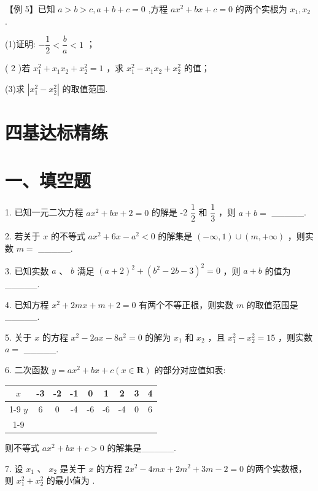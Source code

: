 【例 5】已知 $a > b > c,a + b + c = 0$ ,方程 $a{x}^{2} + {bx} + c = 0$ 的两个实根为 ${x}_{1},{x}_{2}$ .

(1)证明: $- \dfrac{1}{2} < \dfrac{b}{a} < 1$ ；

( 2 )若 ${x}_{1}^{2} + {x}_{1}{x}_{2} + {x}_{2}^{2} = 1$ ，求 ${x}_{1}^{2} - {x}_{1}{x}_{2} + {x}_{2}^{2}$ 的值；

(3)求 $\left| {{x}_{1}^{2} - {x}_{2}^{2}}\right|$ 的取值范围.

\section*{四基达标精练}

\section*{一、填空题}

1. 已知一元二次方程 $a{x}^{2} + {bx} + 2 = 0$ 的解是 -2 $\dfrac{1}{2}$ 和 $\dfrac{1}{3}$ ，则 $a + b =$ \_\_\_\_\_.

2. 若关于 $x$ 的不等式 $a{x}^{2} + {6x} - {a}^{2} < 0$ 的解集是 $\left( {-\infty ,1}\right)  \cup  \left( {m, + \infty }\right)$ ，则实数 $m =$ \_\_\_\_\_.

3. 已知实数 $a$ 、 $b$ 满足 ${\left( a + 2\right) }^{2} + {\left( {b}^{2} - 2b - 3\right) }^{2} = 0$ ，则 $a + b$ 的值为\_\_\_\_\_.

4. 已知方程 ${x}^{2} + {2mx} + m + 2 = 0$ 有两个不等正根，则实数 $m$ 的取值范围是\_\_\_\_\_.

5. 关于 $x$ 的方程 ${x}^{2} - {2ax} - 8{a}^{2} = 0$ 的解为 ${x}_{1}$ 和 ${x}_{2}$ ，且 ${x}_{1}^{2} - {x}_{2}^{2} = {15}$ ，则实数 $a =$ \_\_\_\_\_.

6. 二次函数 $y = a{x}^{2} + {bx} + c\left( {x \in  \mathbf{R}}\right)$ 的部分对应值如表:

\begin{center}
\begin{tabular}{|c|c|c|c|c|c|c|c|c|}
\hline
$x$ & -3 & -2 & -1 & 0 & 1 & 2 & 3 & 4 \\
\cline{1-9}
$y$ & 6 & 0 & -4 & -6 & -6 & -4 & 0 & 6 \\
\cline{1-9}
\hline
\end{tabular}
\end{center}

则不等式 $a{x}^{2} + {bx} + c > 0$ 的解集是\_\_\_\_\_.

7. 设 ${x}_{1}$ 、 ${x}_{2}$ 是关于 $x$ 的方程 $2{x}^{2} - {4mx} + 2{m}^{2} + {3m} - 2 = 0$ 的两个实数根，则 ${x}_{1}^{2} + {x}_{2}^{2}$ 的最小值为 .

